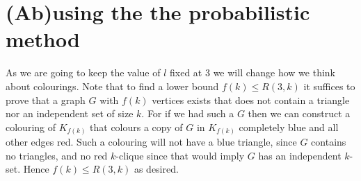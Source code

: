 \documentclass{report}
\theoremstyle{definition}
\theoremstyle{plain}
\theoremstyle{definition}
\begin{document}
	\section{(Ab)using the the probabilistic method}
	As we are going to keep the value of $l$ fixed at 3 we will change how we think about colourings. Note that to find a lower bound $f(k) \leq R(3,k)$ it suffices to prove that a graph $G$ with $f(k)$ vertices exists that does not contain a triangle nor an independent set of size $k$. For if we had such a $G$ then we can construct a colouring of $K_{f(k)}$ that colours a copy of $G$ in $K_{f(k)}$ completely blue and all other edges red. Such a colouring will not have a blue triangle, since $G$ contains no triangles, and no red $k$-clique since that would imply $G$ has an independent $k$-set. Hence $f(k) \leq R(3,k)$ as desired.
	
\end{document}
